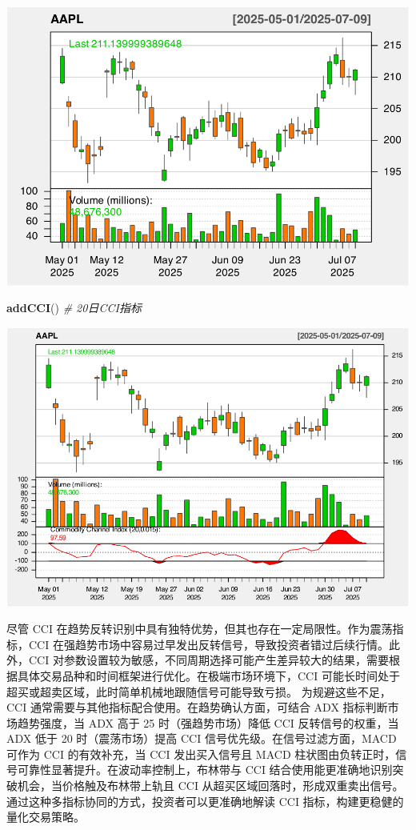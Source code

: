 \documentclass[]{ctexbook}
\newenvironment{Shaded}{\begin{snugshade}}{\end{snugshade}}
\newcommand{\CommentTok}[1]{\textcolor[rgb]{0.56,0.35,0.01}{\textit{#1}}}
\newcommand{\FunctionTok}[1]{\textcolor[rgb]{0.13,0.29,0.53}{\textbf{#1}}}
\newcommand{\NormalTok}[1]{#1}
\begin{document}
\includegraphics[width=0.9\linewidth]{quantmod_files/figure-latex/cci-1}

\begin{Shaded}
\begin{Highlighting}[]
\FunctionTok{addCCI}\NormalTok{()  }\CommentTok{\# 20日CCI指标}
\end{Highlighting}
\end{Shaded}

\includegraphics[width=0.9\linewidth]{quantmod_files/figure-latex/cci-2}

尽管 CCI 在趋势反转识别中具有独特优势，但其也存在一定局限性。作为震荡指标，CCI 在强趋势市场中容易过早发出反转信号，导致投资者错过后续行情。此外，CCI 对参数设置较为敏感，不同周期选择可能产生差异较大的结果，需要根据具体交易品种和时间框架进行优化。在极端市场环境下，CCI 可能长时间处于超买或超卖区域，此时简单机械地跟随信号可能导致亏损。
为规避这些不足，CCI 通常需要与其他指标配合使用。在趋势确认方面，可结合 ADX 指标判断市场趋势强度，当 ADX 高于 25 时（强趋势市场）降低 CCI 反转信号的权重，当 ADX 低于 20 时（震荡市场）提高 CCI 信号优先级。在信号过滤方面，MACD 可作为 CCI 的有效补充，当 CCI 发出买入信号且 MACD 柱状图由负转正时，信号可靠性显著提升。在波动率控制上，布林带与 CCI 结合使用能更准确地识别突破机会，当价格触及布林带上轨且 CCI 从超买区域回落时，形成双重卖出信号。通过这种多指标协同的方式，投资者可以更准确地解读 CCI 指标，构建更稳健的量化交易策略。
\end{document}
